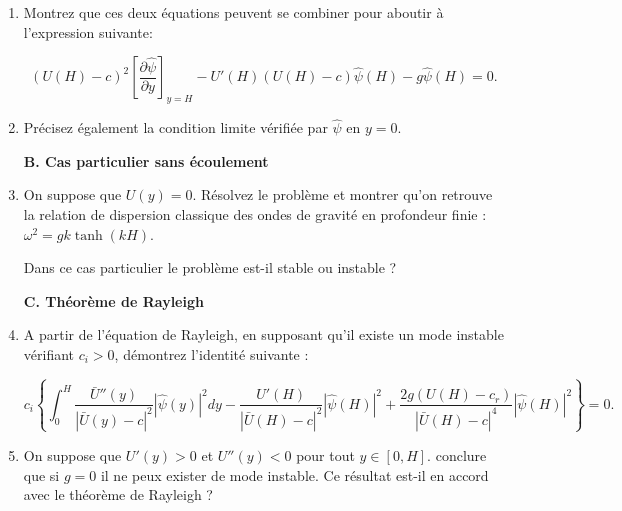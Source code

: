 \documentclass[a4paper,11pt]{article}
\begin{document}
\begin{enumerate}
   \item Montrez que ces deux équations peuvent se combiner pour aboutir à l'expression suivante:
   
 \begin{equation}
  \left( U(H) - c\right)^2  {\left[ \frac{\partial \hat{\psi}}{\partial y} \right] }_{y=H}  - U'(H) \left( U(H) - c\right) \hat{\psi}(H) - g \hat{\psi}(H) = 0.
\end{equation}

\item Précisez également la condition limite vérifiée par $\hat{\psi}$ en $y=0$.


{\bf B. Cas particulier sans écoulement}

\item On suppose que $U(y) = 0$. Résolvez le problème et montrer qu'on retrouve la relation de dispersion classique des ondes de gravité en profondeur finie :
$\omega ^2 = g k \tanh (kH)$.

Dans ce cas particulier le problème est-il stable ou instable ?

 



{\bf C. Théorème de Rayleigh}

\item A partir de l'équation de Rayleigh, en supposant qu'il existe un mode instable vérifiant $c_i > 0$, démontrez l'identité suivante :

$$
 c_i \left\{ \int_{0}^{H} \frac{\bar{U}''(y)}{|\bar{U}(y)-c|^2} |\hat{\psi}(y)|^2 d y 
-  \frac{U'(H) }{|\bar{U}(H)-c|^2} |\hat{\psi}(H)|^2 + \frac{2 g (U(H) - c_r)  }{|\bar{U}(H)-c|^4} |\hat{\psi}(H)|^2
\right\} = 0.
$$

\item 

On suppose que $U'(y) >0$ et $U''(y) <0$ pour tout $y \in [0,H]$.
conclure que si $g=0$ il ne peux exister de mode instable. Ce résultat est-il en accord avec le théorème de Rayleigh ?




\end{enumerate}
\end{document}
